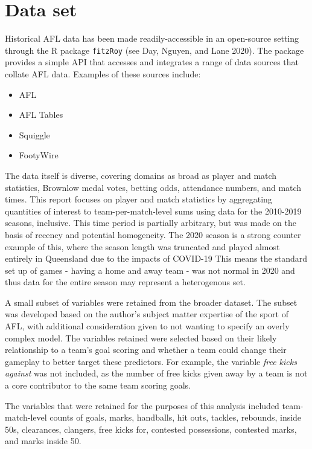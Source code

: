 \documentclass{article}
\begin{document}
\hypertarget{data-set}{%
\section{Data set}\label{data-set}}

Historical AFL data has been made readily-accessible in an open-source
setting through the R package \texttt{fitzRoy} (see Day, Nguyen, and
Lane 2020). The package provides a simple API that accesses and
integrates a range of data sources that collate AFL data. Examples of
these sources include:

\begin{itemize}
  \item{AFL}
  \item{AFL Tables}
  \item{Squiggle}
  \item{FootyWire}
\end{itemize}

The data itself is diverse, covering domains as broad as player and
match statistics, Brownlow medal votes, betting odds, attendance
numbers, and match times. This report focuses on player and match
statistics by aggregating quantities of interest to team-per-match-level
sums using data for the 2010-2019 seasons, inclusive. This time period
is partially arbitrary, but was made on the basis of recency and
potential homogeneity. The 2020 season is a strong counter example of
this, where the season length was truncated and played almost entirely
in Queensland due to the impacts of COVID-19 This means the standard set
up of games - having a home and away team - was not normal in 2020 and
thus data for the entire season may represent a heterogenous set.

A small subset of variables were retained from the broader dataset. The
subset was developed based on the author's subject matter expertise of
the sport of AFL, with additional consideration given to not wanting to
specify an overly complex model. The variables retained were selected
based on their likely relationship to a team's goal scoring and whether
a team could change their gameplay to better target these predictors.
For example, the variable \emph{free kicks against} was not included, as
the number of free kicks given away by a team is not a core contributor
to the same team scoring goals.

The variables that were retained for the purposes of this analysis
included team-match-level counts of goals, marks, handballs, hit outs,
tackles, rebounds, inside 50s, clearances, clangers, free kicks for,
contested possessions, contested marks, and marks inside 50.
\end{document}
